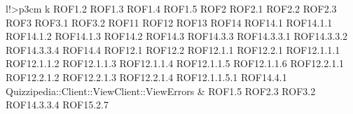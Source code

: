\begin{tabella}{l!{\VRule}>{\centering\arraybackslash}p{3cm}}
k ROF1.2 \linebreak ROF1.3 \linebreak ROF1.4 \linebreak ROF1.5 \linebreak ROF2 \linebreak ROF2.1 \linebreak ROF2.2 \linebreak ROF2.3 \linebreak ROF3 \linebreak ROF3.1 \linebreak ROF3.2 \linebreak ROF11 \linebreak ROF12 \linebreak ROF13 \linebreak ROF14 \linebreak ROF14.1 \linebreak ROF14.1.1 \linebreak ROF14.1.2 \linebreak ROF14.1.3 \linebreak ROF14.2 \linebreak ROF14.3 \linebreak ROF14.3.3 \linebreak ROF14.3.3.1 \linebreak ROF14.3.3.2 \linebreak ROF14.3.3.4 \linebreak ROF14.4 \linebreak ROF12.1 \linebreak ROF12.2 \linebreak ROF12.1.1 \linebreak ROF12.2.1 \linebreak ROF12.1.1.1 \linebreak ROF12.1.1.2 \linebreak ROF12.1.1.3 \linebreak ROF12.1.1.4 \linebreak ROF12.1.1.5 \linebreak ROF12.1.1.6 \linebreak ROF12.2.1.1 \linebreak ROF12.2.1.2 \linebreak ROF12.2.1.3 \linebreak ROF12.2.1.4 \linebreak ROF12.1.1.5.1 \linebreak ROF14.4.1 \\
Quizzipedia::Client::ViewClient::ViewErrors & ROF1.5 \linebreak ROF2.3 \linebreak ROF3.2 \linebreak ROF14.3.3.4 \linebreak ROF15.2.7 \\

\end{tabella}
